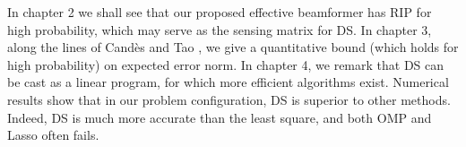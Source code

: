In chapter 2 we shall see that our proposed effective beamformer has RIP for high probability, which may serve as the sensing matrix for DS.
In chapter 3, along the lines of Candès and Tao \cite {CaT07}, we give a quantitative bound (which holds for high probability) on expected error norm.
In chapter 4, we remark that DS can be cast as a linear program, for which more efficient algorithms exist.
Numerical results show that in our problem configuration, DS is superior to other methods.
Indeed, DS is much more accurate than the least square, and both OMP and Lasso often fails.






